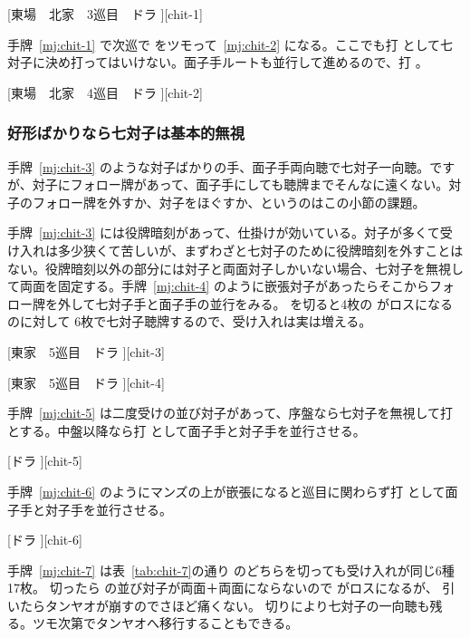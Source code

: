 \documentclass[../nankiru_main.tex]{subfiles}
\begin{document}
[東場　北家　3巡目　ドラ ][chit-1]

手牌~\ref{mj:chit-1} で次巡で  をツモって~\ref{mj:chit-2} になる。ここでも打  として七対子に決め打ってはいけない。面子手ルートも並行して進めるので、打  \citep[][p.~83]{zero-teyaku}。

[東場　北家　4巡目　ドラ ][chit-2]


\subsubsection*{好形ばかりなら七対子は基本的無視}

手牌~\ref{mj:chit-3} のような対子ばかりの手、面子手両向聴で七対子一向聴。ですが、対子にフォロー牌があって、面子手にしても聴牌までそんなに遠くない。対子のフォロー牌を外すか、対子をほぐすか、というのはこの小節の課題。

手牌~\ref{mj:chit-3} には役牌暗刻があって、仕掛けが効いている。対子が多くて受け入れは多少狭くて苦しいが、まずわざと七対子のために役牌暗刻を外すことはない。役牌暗刻以外の部分には対子と両面対子しかいない場合、七対子を無視して両面を固定する。手牌~\ref{mj:chit-4} のように嵌張対子があったらそこからフォロー牌を外して七対子手と面子手の並行をみる。 を切ると4枚の  がロスになるのに対して  6枚で七対子聴牌するので、受け入れは実は増える\citep[][p.~83]{zero-teyaku}。

[東家　5巡目　ドラ ][chit-3]

[東家　5巡目　ドラ ][chit-4]

手牌~\ref{mj:chit-5} は二度受けの並び対子があって、序盤なら七対子を無視して打  とする。中盤以降なら打  として面子手と対子手を並行させる\citep[][p.~84]{zero-teyaku}。

[ドラ ][chit-5]

手牌~\ref{mj:chit-6} のようにマンズの上が嵌張になると巡目に関わらず打  として面子手と対子手を並行させる\citep[][p.~84]{zero-teyaku}。

[ドラ ][chit-6]

手牌~\ref{mj:chit-7} は表~\ref{tab:chit-7}の通り  のどちらを切っても受け入れが同じ6種17枚。 切ったら  の並び対子が両面＋両面にならないので  がロスになるが、 引いたらタンヤオが崩すのでさほど痛くない。 切りにより七対子の一向聴も残る。ツモ次第でタンヤオへ移行することもできる\citep[][p.~18]{uzaku-nankiru}。
\end{document}
